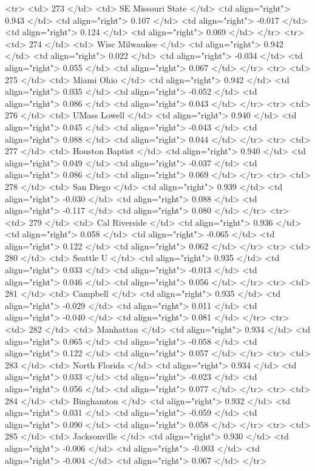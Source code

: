   <tr> <td> 273 </td> <td> SE Missouri State </td> <td align="right"> 0.943 </td> <td align="right"> 0.107 </td> <td align="right"> -0.017 </td> <td align="right"> 0.124 </td> <td align="right"> 0.069 </td> </tr>
  <tr> <td> 274 </td> <td> Wisc Milwaukee </td> <td align="right"> 0.942 </td> <td align="right"> 0.022 </td> <td align="right"> -0.034 </td> <td align="right"> 0.055 </td> <td align="right"> 0.067 </td> </tr>
  <tr> <td> 275 </td> <td> Miami Ohio </td> <td align="right"> 0.942 </td> <td align="right"> 0.035 </td> <td align="right"> -0.052 </td> <td align="right"> 0.086 </td> <td align="right"> 0.043 </td> </tr>
  <tr> <td> 276 </td> <td> UMass Lowell </td> <td align="right"> 0.940 </td> <td align="right"> 0.045 </td> <td align="right"> -0.043 </td> <td align="right"> 0.088 </td> <td align="right"> 0.044 </td> </tr>
  <tr> <td> 277 </td> <td> Houston Baptist </td> <td align="right"> 0.940 </td> <td align="right"> 0.049 </td> <td align="right"> -0.037 </td> <td align="right"> 0.086 </td> <td align="right"> 0.069 </td> </tr>
  <tr> <td> 278 </td> <td> San Diego </td> <td align="right"> 0.939 </td> <td align="right"> -0.030 </td> <td align="right"> 0.088 </td> <td align="right"> -0.117 </td> <td align="right"> 0.080 </td> </tr>
  <tr> <td> 279 </td> <td> Cal Riverside </td> <td align="right"> 0.936 </td> <td align="right"> 0.058 </td> <td align="right"> -0.065 </td> <td align="right"> 0.122 </td> <td align="right"> 0.062 </td> </tr>
  <tr> <td> 280 </td> <td> Seattle U </td> <td align="right"> 0.935 </td> <td align="right"> 0.033 </td> <td align="right"> -0.013 </td> <td align="right"> 0.046 </td> <td align="right"> 0.056 </td> </tr>
  <tr> <td> 281 </td> <td> Campbell </td> <td align="right"> 0.935 </td> <td align="right"> -0.029 </td> <td align="right"> 0.011 </td> <td align="right"> -0.040 </td> <td align="right"> 0.081 </td> </tr>
  <tr> <td> 282 </td> <td> Manhattan </td> <td align="right"> 0.934 </td> <td align="right"> 0.065 </td> <td align="right"> -0.058 </td> <td align="right"> 0.122 </td> <td align="right"> 0.057 </td> </tr>
  <tr> <td> 283 </td> <td> North Florida </td> <td align="right"> 0.934 </td> <td align="right"> 0.033 </td> <td align="right"> -0.023 </td> <td align="right"> 0.056 </td> <td align="right"> 0.077 </td> </tr>
  <tr> <td> 284 </td> <td> Binghamton </td> <td align="right"> 0.932 </td> <td align="right"> 0.031 </td> <td align="right"> -0.059 </td> <td align="right"> 0.090 </td> <td align="right"> 0.058 </td> </tr>
  <tr> <td> 285 </td> <td> Jacksonville </td> <td align="right"> 0.930 </td> <td align="right"> -0.006 </td> <td align="right"> -0.003 </td> <td align="right"> -0.004 </td> <td align="right"> 0.067 </td> </tr>
